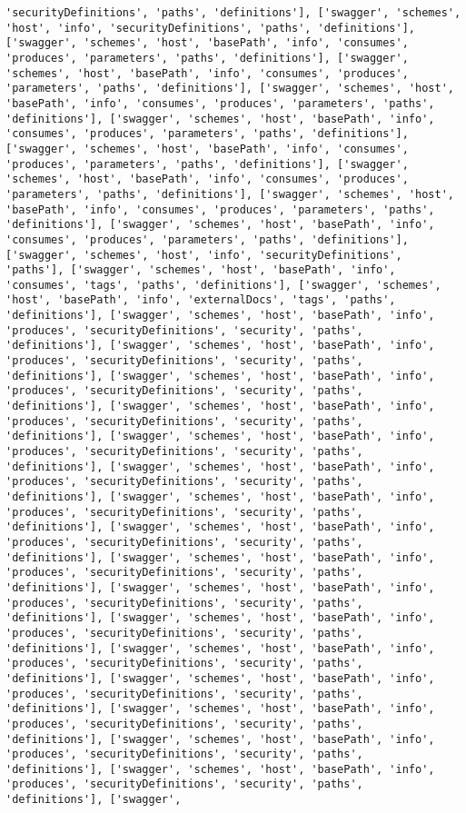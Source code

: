 \documentclass[11pt]{article}
\begin{document}
\begin{Verbatim}[commandchars=\\\{\}]
'securityDefinitions', 'paths', 'definitions'], ['swagger', 'schemes', 'host', 'info', 'securityDefinitions', 'paths', 'definitions'], ['swagger', 'schemes', 'host', 'basePath', 'info', 'consumes', 'produces', 'parameters', 'paths', 'definitions'], ['swagger', 'schemes', 'host', 'basePath', 'info', 'consumes', 'produces', 'parameters', 'paths', 'definitions'], ['swagger', 'schemes', 'host', 'basePath', 'info', 'consumes', 'produces', 'parameters', 'paths', 'definitions'], ['swagger', 'schemes', 'host', 'basePath', 'info', 'consumes', 'produces', 'parameters', 'paths', 'definitions'], ['swagger', 'schemes', 'host', 'basePath', 'info', 'consumes', 'produces', 'parameters', 'paths', 'definitions'], ['swagger', 'schemes', 'host', 'basePath', 'info', 'consumes', 'produces', 'parameters', 'paths', 'definitions'], ['swagger', 'schemes', 'host', 'basePath', 'info', 'consumes', 'produces', 'parameters', 'paths', 'definitions'], ['swagger', 'schemes', 'host', 'basePath', 'info', 'consumes', 'produces', 'parameters', 'paths', 'definitions'], ['swagger', 'schemes', 'host', 'info', 'securityDefinitions', 'paths'], ['swagger', 'schemes', 'host', 'basePath', 'info', 'consumes', 'tags', 'paths', 'definitions'], ['swagger', 'schemes', 'host', 'basePath', 'info', 'externalDocs', 'tags', 'paths', 'definitions'], ['swagger', 'schemes', 'host', 'basePath', 'info', 'produces', 'securityDefinitions', 'security', 'paths', 'definitions'], ['swagger', 'schemes', 'host', 'basePath', 'info', 'produces', 'securityDefinitions', 'security', 'paths', 'definitions'], ['swagger', 'schemes', 'host', 'basePath', 'info', 'produces', 'securityDefinitions', 'security', 'paths', 'definitions'], ['swagger', 'schemes', 'host', 'basePath', 'info', 'produces', 'securityDefinitions', 'security', 'paths', 'definitions'], ['swagger', 'schemes', 'host', 'basePath', 'info', 'produces', 'securityDefinitions', 'security', 'paths', 'definitions'], ['swagger', 'schemes', 'host', 'basePath', 'info', 'produces', 'securityDefinitions', 'security', 'paths', 'definitions'], ['swagger', 'schemes', 'host', 'basePath', 'info', 'produces', 'securityDefinitions', 'security', 'paths', 'definitions'], ['swagger', 'schemes', 'host', 'basePath', 'info', 'produces', 'securityDefinitions', 'security', 'paths', 'definitions'], ['swagger', 'schemes', 'host', 'basePath', 'info', 'produces', 'securityDefinitions', 'security', 'paths', 'definitions'], ['swagger', 'schemes', 'host', 'basePath', 'info', 'produces', 'securityDefinitions', 'security', 'paths', 'definitions'], ['swagger', 'schemes', 'host', 'basePath', 'info', 'produces', 'securityDefinitions', 'security', 'paths', 'definitions'], ['swagger', 'schemes', 'host', 'basePath', 'info', 'produces', 'securityDefinitions', 'security', 'paths', 'definitions'], ['swagger', 'schemes', 'host', 'basePath', 'info', 'produces', 'securityDefinitions', 'security', 'paths', 'definitions'], ['swagger', 'schemes', 'host', 'basePath', 'info', 'produces', 'securityDefinitions', 'security', 'paths', 'definitions'], ['swagger', 'schemes', 'host', 'basePath', 'info', 'produces', 'securityDefinitions', 'security', 'paths', 'definitions'], ['swagger', 'schemes', 'host', 'basePath', 'info', 'produces', 'securityDefinitions', 'security', 'paths', 'definitions'], ['swagger', 
\end{Verbatim}
\end{document}

